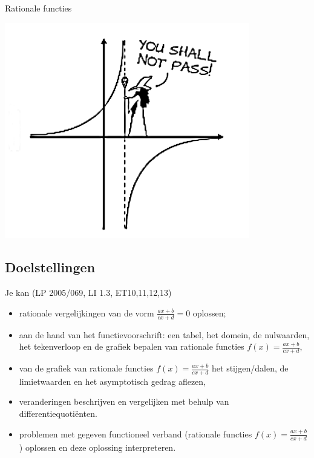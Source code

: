\documentclass[12pt]{article}
\begin{document}
\thispagestyle{empty}
\begin{center}
  \begin{mdframed}
  \centering
  \fontsize{35}{70}\selectfont Rationale functies
  \end{mdframed}
  \vfill
  \includegraphics[width=0.8\textwidth]{youshallnotpass}
  \vfill
\end{center}
\vspace*{-2cm}
\subsection*{Doelstellingen}
{\singlespacing

Je kan \hfill  {\scriptsize(LP 2005/069, LI 1.3, ET10,11,12,13)}
\begin{itemize}
  \item rationale vergelijkingen van de vorm $\frac{ax+b}{cx+d}=0$ oplossen;
\item aan de hand van het functievoorschrift: een tabel, het domein, de nulwaarden, het tekenverloop en de grafiek bepalen van rationale functies $f(x)=\frac{ax+b}{cx+d}$,
  \item van de grafiek van rationale functies $f(x)=\frac{ax+b}{cx+d}$ het stijgen/dalen, de limietwaarden en het asymptotisch gedrag aflezen,
  \item veranderingen beschrijven en vergelijken met behulp van differentiequotiënten.
  \item problemen met gegeven functioneel verband (rationale functies $f(x)=\frac{ax+b}{cx+d}$) oplossen en deze oplossing interpreteren.
\end{itemize}

}
\thispagestyle{empty}
\newpage
\thispagestyle{empty}
\tableofcontents
\newpage
\clearpage
{}
\pagestyle{fancy}
\lhead{}
\fancyhead[RE,LO]{}
\end{document}
